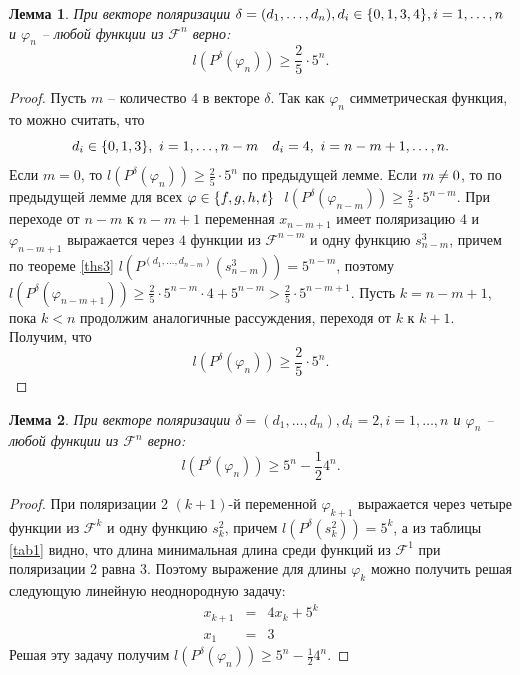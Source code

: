 \documentclass[bibliography=totoc, a4paper, 14pt]{extarticle}
\newtheorem{mylm}{Лемма}
\newcommand{\pphi}[1] {P^{\delta}(\varphi_{#1})}
\def\neq{\not=\nobreak\discretionary{}{\usefont{OMS}{cmsy}{m}{n}\char54\usefont{OT1}{cmr}{m}{n}\char61}{}}
\def\in{\mathchar"3232\nobreak\discretionary{}{\usefont{OMS}{cmsy}{m}{n}\char50}{}}
\begin{document}
\begin{mylm}
При векторе поляризации $\delta = (d_1,\dots,d_n), d_i \in \{0,1,3,4\}, i = 1,\dots,n$ и
$\varphi_n$ -- любой функции из $\mathcal{F}^n$ верно:
$$l(\pphi{n}) \geqslant \frac{2}{5} \cdot 5^n.$$
\end{mylm}
\begin{proof}
Пусть $m$ -- количество $4$ в векторе $\delta$.
Так как $\varphi_n$ симметрическая функция, то можно считать, что
$$d_i \in \{0,1,3\},\ i=1,\dots,n-m \quad d_i = 4,\ i=n-m+1,\dots,n.$$
Если $m=0$, то $l(\pphi{n}) \geqslant \frac{2}{5} \cdot 5^n$ по предыдущей лемме.
Если $m \neq 0$, то по предыдущей лемме для всех $\varphi \in \{f,g,h,t\}\ $
$l(\pphi{n-m}) \geqslant \frac{2}{5} \cdot 5^{n-m}$. При переходе от ${n-m}$ к ${n-m+1}$ переменная
$x_{n-m+1}$ имеет поляризацию $4$ и $\varphi_{n-m+1}$ выражается через $4$ функции из
$\mathcal{F}^{n-m}$ и одну функцию $s^3_{n-m}$, причем по теореме \ref{ths3}
$l(P^{(d_1,\dots,d_{n-m})}(s^3_{n-m})) = 5^{n-m}$, поэтому
$l(\pphi{n-m+1}) \geqslant \frac{2}{5}\cdot5^{n-m}\cdot4+5^{n-m}>\frac{2}{5}\cdot5^{n-m+1}$. Пусть
$k=n-m+1$, пока $k<n$ продолжим аналогичные рассуждения, переходя от $k$ к $k+1$. Получим, что
$$l(\pphi{n}) \geqslant \frac{2}{5} \cdot 5^n.$$
\end{proof}

\begin{mylm}
\label{lm2l}
При векторе поляризации $\delta = (d_1,\dots,d_n), d_i = 2, i = 1,\dots,n$ и
$\varphi_n$ -- любой функции из $\mathcal{F}^n$ верно:
$$l(\pphi{n}) \geqslant 5^n - \frac{1}{2}4^n.$$
\end{mylm}
\begin{proof}
При поляризации 2 $(k+1)$-й переменной $\varphi_{k+1}$ выражается через четыре функции из
$\mathcal{F}^k$ и одну функцию $s^2_k$, причем $l(P^{\delta}(s^2_k)) = 5^k$, а из таблицы
\ref{tab1} видно, что длина минимальная длина среди функций из $\mathcal{F}^1$ при поляризации 2
равна 3. Поэтому выражение для длины $\varphi_k$ можно получить решая следующую линейную
неоднородную задачу:
$$ \begin{array}{lcl}
x_{k+1} &=& 4 x_k + 5^k \\
x_1     &=& 3 
\end{array} $$
Решая эту задачу получим $l(\pphi{n}) \geqslant 5^n - \frac{1}{2}4^n$.
\end{proof}
\end{document}
